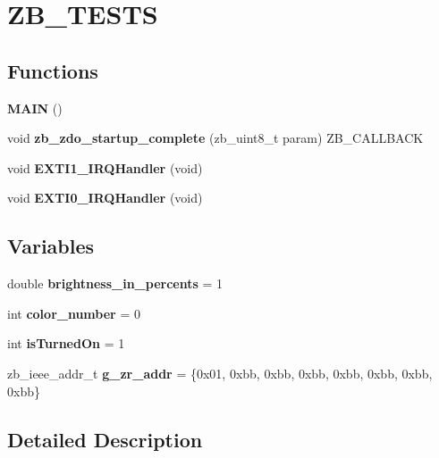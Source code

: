 \hypertarget{group__ZB__TESTS}{}\section{Z\+B\+\_\+\+T\+E\+S\+TS}
\label{group__ZB__TESTS}
\subsection*{Functions}
\begin{DoxyCompactItemize}
\item 
\mbox{\label{group__ZB__TESTS_ga9b0391c94abcdf28fbc68d7b674e6ffe}} 
{\bfseries M\+A\+IN} ()
\item 
\mbox{\label{group__ZB__TESTS_ga03baac8a16440e90c699a5a17124b3c5}} 
void {\bfseries zb\+\_\+zdo\+\_\+startup\+\_\+complete} (zb\+\_\+uint8\+\_\+t param) Z\+B\+\_\+\+C\+A\+L\+L\+B\+A\+CK
\item 
\mbox{\label{group__ZB__TESTS_ga49cfdd46eb8d0ef3e1987514aa9343dc}} 
void {\bfseries E\+X\+T\+I1\+\_\+\+I\+R\+Q\+Handler} (void)
\item 
\mbox{\label{group__ZB__TESTS_ga17e9789a29a87d2df54f12b94dd1a0b6}} 
void {\bfseries E\+X\+T\+I0\+\_\+\+I\+R\+Q\+Handler} (void)
\end{DoxyCompactItemize}
\subsection*{Variables}
\begin{DoxyCompactItemize}
\item 
\mbox{\label{group__ZB__TESTS_gabe3489e32390999b588432150dbb8578}} 
double {\bfseries brightness\+\_\+in\+\_\+percents} = 1
\item 
\mbox{\label{group__ZB__TESTS_gade194faecb81ef2017a7e3df28a74700}} 
int {\bfseries color\+\_\+number} = 0
\item 
\mbox{\label{group__ZB__TESTS_ga884c92e4b1bce07805424b96ccfd8330}} 
int {\bfseries is\+Turned\+On} = 1
\item 
\mbox{\label{group__ZB__TESTS_ga5d3434c9c9bc4fdac4caa0b14e924b76}} 
zb\+\_\+ieee\+\_\+addr\+\_\+t {\bfseries g\+\_\+zr\+\_\+addr} = \{0x01, 0xbb, 0xbb, 0xbb, 0xbb, 0xbb, 0xbb, 0xbb\}
\end{DoxyCompactItemize}


\subsection{Detailed Description}
